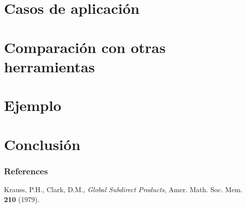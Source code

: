 \documentclass[12pt]{beamer}
\begin{document}
\section{Casos de aplicación}

\begin{frame}
\end{frame}

\section{Comparación con otras herramientas}
\begin{frame}
\end{frame}

\section{Ejemplo}
\begin{frame}
\end{frame}

\section{Conclusión}
\begin{frame}
\end{frame}



\begin{frame}%
\frametitle{References}

\begin{thebibliography}{CamVag2009}

{}\textrm{Krauss, P.H., Clark, D.M.}, 
\textit{Global Subdirect Products}, Amer. Math. Soc. Mem. \textbf{210} (1979).


\end{thebibliography}

\end{frame}

\begin{frame}
\begin{figure}[center]
\end{figure}
\end{frame}
\end{document}
